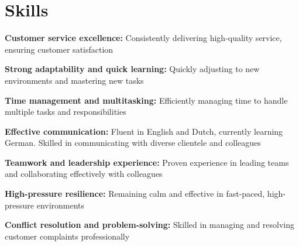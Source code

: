 	\section{Skills}
	
	\begin{onecolentry}
			\textbf{Customer service excellence:} Consistently delivering high-quality service, ensuring customer satisfaction
		\end{onecolentry}
	
	\vspace{0.2 cm}
	
	\begin{onecolentry}
			\textbf{Strong adaptability and quick learning:} Quickly adjusting to new environments and mastering new tasks
		\end{onecolentry}
	
	\vspace{0.2 cm}
	
	\begin{onecolentry}
		\textbf{Time management and multitasking:} Efficiently managing time to handle multiple tasks and responsibilities
	\end{onecolentry}
	
	\vspace{0.2 cm}
	
	\begin{onecolentry}
		\textbf{Effective communication:} Fluent in English and Dutch, currently learning German. Skilled in communicating with diverse clientele and colleagues
	\end{onecolentry}
	
	\vspace{0.2 cm}
	
	\begin{onecolentry}
		\textbf{Teamwork and leadership experience:} Proven experience in leading teams and collaborating effectively with colleagues
	\end{onecolentry}
	
	\vspace{0.2 cm}
	
	\begin{onecolentry}
		\textbf{High-pressure resilience:} Remaining calm and effective in fast-paced, high-pressure environments
	\end{onecolentry}
	
	\vspace{0.2 cm}
	
	\begin{onecolentry}
		\textbf{Conflict resolution and problem-solving:} Skilled in managing and resolving customer complaints professionally
	\end{onecolentry}
	
